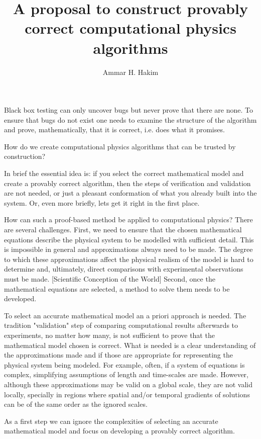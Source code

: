 \documentclass[11pt, reqno]{amsart}
\title[Provably correct algorithms]{A proposal to construct provably
  correct computational physics algorithms}%
\author{Ammar H. Hakim}%
\date{}
\theoremstyle{definition}
\begin{document}
\maketitle

Black box testing can only uncover bugs but never prove that there are
none. To ensure that bugs do not exist one needs to examine the
structure of the algorithm and prove, mathematically, that it is
correct, i.e. does what it promises.

How do we create computational physics algorithms that can be trusted
by construction?

In brief the essential idea is: if you select the correct mathematical
model and create a provably correct algorithm, then the steps of
verification and validation are not needed, or just a pleasant
conformation of what you already built into the system. Or, even more
briefly, lets get it right in the first place.

How can such a proof-based method be applied to computational physics?
There are several challenges. First, we need to ensure that the chosen
mathematical equations describe the physical system to be modelled
with sufficient detail. This is impossible in general and
approximations always need to be made. The degree to which these
approximations affect the physical realism of the model is hard to
determine and, ultimately, direct comparisons with experimental
observations must be made. [Scientific Conception of the World]
Second, once the mathematical equations are selected, a method to
solve them needs to be developed.

To select an accurate mathematical model an a priori approach is
needed. The tradition "validation" step of comparing computational
results afterwards to experiments, no matter how many, is not
sufficient to prove that the mathematical model chosen is
correct. What is needed is a clear understanding of the approximations
made and if those are appropriate for representing the physical system
being modeled. For example, often, if a system of equations is
complex, simplifying assumptions of length and time-scales are
made. However, although these approximations may be valid on a global
scale, they are not valid locally, specially in regions where spatial
and/or temporal gradients of solutions can be of the same order as the
ignored scales.

As a first step we can ignore the complexities of selecting an
accurate mathematical model and focus on developing a provably correct
algorithm.
\end{document}
